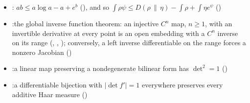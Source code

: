 \documentclass[11pt]{article}
\begin{document}
\begin{itemize}
\begin{itemize}
  density with finite entropy on a finite-dimensional space is approximated in relative entropy
  by positive $C^n$ probability densities
  (), each shell
  $k \le |x| < k + 1$ smoothed at a scale of its own; the same construction applied to
  $\min(\rho, j)$ gives positive $C^n$ probability densities $\eta$ with $\rho\log\eta$
  integrable and $\int\rho\log\eta > \int\rho\log\min(\rho, j) - \varepsilon$
  ()
  \item {}:\newline
  $ab \le a\log a - a + e^b$ (), and so
  $\int\rho\psi \le D(\rho\,\|\,\eta) - \int\rho + \int\eta e^\psi$
  ()
  \item {}:\newline the
  global inverse function theorem: an injective $C^n$ map, $n \ge 1$, with an invertible
  derivative at every point is an open embedding with a $C^n$ inverse on its range
  (, ,
  ); conversely, a left inverse
  differentiable on the range forces a nonzero Jacobian
  ()
  \item {}:\newline a linear map
  preserving a nondegenerate bilinear form has $\det^2 = 1$
  ()
  \item {}:\newline a differentiable
  bijection with $|\det f'| = 1$ everywhere preserves every additive Haar measure
  ()
  \end{itemize}
\end{itemize}
\end{document}
